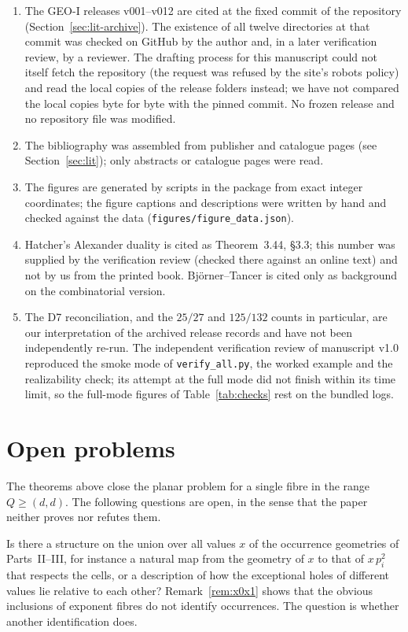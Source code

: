\begin{enumerate}
\item The GEO-I releases v001--v012 are cited at the fixed commit \geoicommit of the repository (Section~\ref{sec:lit-archive}). The existence of all twelve directories at that commit was checked on GitHub by the author and, in a later verification review, by a reviewer. The drafting process for this manuscript could not itself fetch the repository (the request was refused by the site's robots policy) and read the local copies of the release folders instead; we have not compared the local copies byte for byte with the pinned commit. No frozen release and no repository file was modified.
\item The bibliography was assembled from publisher and catalogue pages (see Section~\ref{sec:lit}); only abstracts or catalogue pages were read.
\item The figures are generated by scripts in the package from exact integer coordinates; the figure captions and descriptions were written by hand and checked against the data (\texttt{figures/figure\_data.json}).
\item Hatcher's Alexander duality is cited as Theorem~3.44, \S3.3; this number was supplied by the verification review (checked there against an online text) and not by us from the printed book. Bj\"orner--Tancer is cited only as background on the combinatorial version.
\item The D7 reconciliation, and the $25/27$ and $125/132$ counts in particular, are our interpretation of the archived release records and have not been independently re-run. The independent verification review of manuscript v1.0 reproduced the smoke mode of \texttt{verify\_all.py}, the worked example and the realizability check; its attempt at the full mode did not finish within its time limit, so the full-mode figures of Table~\ref{tab:checks} rest on the bundled logs.
\end{enumerate}

\section{Open problems}\label{sec:open}

The theorems above close the planar problem for a single fibre in the range $Q\ge(d,d)$. The following questions are open, in the sense that the paper neither proves nor refutes them.

\begin{question}\label{q:global}
Is there a structure on the union over all values $x$ of the occurrence geometries of Parts~II--III, for instance a natural map from the geometry of $x$ to that of $x\,p_i^2$ that respects the cells, or a description of how the exceptional holes of different values lie relative to each other? Remark~\ref{rem:x0x1} shows that the obvious inclusions of exponent fibres do not identify occurrences. The question is whether another identification does.
\end{question}

